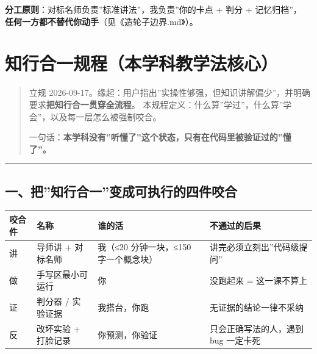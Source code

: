 \documentclass[
  chinese,
  11pt,
]{ctexart}
\newcounter{none} %
\begin{document}
\textbf{分工原则}：对标名师负责''标准讲法''，我负责''你的卡点 + 判分 + 记忆归档''， \textbf{任何一方都不替代你动手}（见《造轮子边界.md》）。

\newpage

\section{知行合一规程（本学科教学法核心）}\label{ux77e5ux884cux5408ux4e00ux89c4ux7a0bux672cux5b66ux79d1ux6559ux5b66ux6cd5ux6838ux5fc3}

\begin{quote}
立规 2026-09-17。缘起：用户指出''实操性够强，但知识讲解偏少''，并明确要求\textbf{把知行合一贯穿全流程}。 本规程定义：什么算''学过''，什么算''学会''，以及每一层怎么被强制咬合。

一句话：\textbf{本学科没有''听懂了''这个状态，只有在代码里被验证过的''懂了''。}
\end{quote}

\begin{center}\rule{0.5\linewidth}{0.5pt}\end{center}

\subsection{一、把''知行合一''变成可执行的四件咬合}\label{ux4e00ux628aux77e5ux884cux5408ux4e00ux53d8ux6210ux53efux6267ux884cux7684ux56dbux4ef6ux54acux5408}

{\def\LTcaptype{none} %
\begin{longtable}[]{@{}
  >{\raggedright\arraybackslash}p{}
  >{\raggedright\arraybackslash}p{}
  >{\raggedright\arraybackslash}p{}
  >{\raggedright\arraybackslash}p{}@{}}
\toprule\noalign{}
\begin{minipage}[b]{\linewidth}\raggedright
咬合件
\end{minipage} & \begin{minipage}[b]{\linewidth}\raggedright
名称
\end{minipage} & \begin{minipage}[b]{\linewidth}\raggedright
谁的活
\end{minipage} & \begin{minipage}[b]{\linewidth}\raggedright
不通过的后果
\end{minipage} \\
\midrule\noalign{}
\endhead
\bottomrule\noalign{}
\endlastfoot
讲 & 导师讲 + 对标名师 & 我（≤20 分钟一块，≤150 字一个概念块） & 讲完必须立刻出''代码级提问'' \\
做 & 手写区最小可运行 & 你 & 没跑起来 = 这一课不算上 \\
证 & 判分器 / 实验证据 & 我搭台，你跑 & 无证据的结论一律不采纳 \\
反 & 改坏实验 + 打脸记录 & 你预测，你验证 & 只会正确写法的人，遇到 bug 一定卡死 \\
\end{longtable}
}
\end{document}
